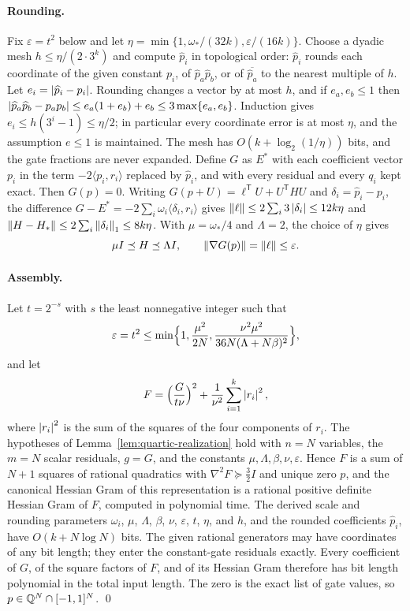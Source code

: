 \paragraph{Rounding.}
Fix $\varepsilon=t^2$ below and let
$\eta=\min\{1,\omega_*/(32k),\varepsilon/(16k)\}$. Choose a dyadic mesh
$h\le\eta/(2\cdot3^k)$ and compute $\widehat p_i$ in topological order:
$\widehat p_i$ rounds each coordinate of the given constant $p_i$, of $\widehat p_a\widehat p_b$, or of
$\overline{\widehat p_a}$ to the nearest multiple of $h$. Let
$e_i=\left\lvert\widehat p_i-p_i\right\rvert$. Rounding changes a vector by at most $h$, and if
$e_a,e_b\le1$ then
$\left\lvert\widehat p_a\widehat p_b-p_ap_b\right\rvert\le e_a(1+e_b)+e_b\le3\max\{e_a,e_b\}$.
Induction gives $e_i\le h(3^i-1)\le\eta/2$; in particular every coordinate error
is at most $\eta$, and the assumption $e\le1$ is maintained. The mesh has
$O(k+\log_2(1/\eta))$ bits, and the gate fractions are never expanded. Define
$G$ as $E^*$ with each coefficient vector $p_i$ in the term
$-2\langle p_i,r_i\rangle$ replaced by $\widehat p_i$, and with every residual and
every $q_i$ kept exact. Then $G(p)=0$. Writing $G(p+U)=\ell^{\mathsf T}U+U^{\mathsf T}HU$
and $\delta_i=\widehat p_i-p_i$, the difference
$G-E^*=-2\sum_i\omega_i\langle\delta_i,r_i\rangle$ gives
$\left\lVert\ell\right\rVert\le2\sum_i3\left\lvert\delta_i\right\rvert\le12k\eta$ and
$\left\lVert H-H_*\right\rVert\le2\sum_i\left\lVert\delta_i\right\rVert_1\le8k\eta$. With
$\mu=\omega_*/4$ and $\Lambda=2$, the choice of $\eta$ gives
\[
 \mu I\preceq H\preceq\Lambda I,\qquad\left\lVert\nabla G(p)\right\rVert=\left\lVert\ell\right\rVert\le\varepsilon .
\]

\paragraph{Assembly.}
Let $t=2^{-s}$ with $s$ the least nonnegative integer such that
\[
 \varepsilon=t^2\le\min\Bigl\{1,\frac{\mu^2}{2N},\frac{\nu^2\mu^2}{36N(\Lambda+N\beta)^2}\Bigr\},
\]
and let
\[
 F=\Bigl(\frac{G}{t\nu}\Bigr)^2+\frac1{\nu^2}\sum_{i=1}^k\left\lvert r_i\right\rvert^2,
\]
where $\left\lvert r_i\right\rvert^2$ is the sum of the squares of the four components of $r_i$.
The hypotheses of Lemma~\ref{lem:quartic-realization} hold with $n=N$
variables, the $m=N$ scalar residuals, $g=G$, and the constants
$\mu,\Lambda,\beta,\nu,\varepsilon$. Hence $F$ is a sum of $N+1$ squares of
rational quadratics with $\nabla^2F\succeq\frac32I$ and unique zero $p$, and the
canonical Hessian Gram of this representation is a rational positive definite
Hessian Gram of $F$, computed in polynomial time. The derived scale and
rounding parameters $\omega_i$, $\mu$, $\Lambda$, $\beta$, $\nu$,
$\varepsilon$, $t$, $\eta$, and $h$, and the rounded coefficients
$\widehat p_i$, have $O(k+N\log N)$ bits. The given rational generators may
have coordinates of any bit length; they enter the constant-gate residuals
exactly. Every coefficient of $G$, of the square factors of $F$, and of its
Hessian Gram therefore has bit length polynomial in the total input length.
The zero is the exact list of gate values, so $p\in\mathbb Q^N\cap[-1,1]^N$. \qed

